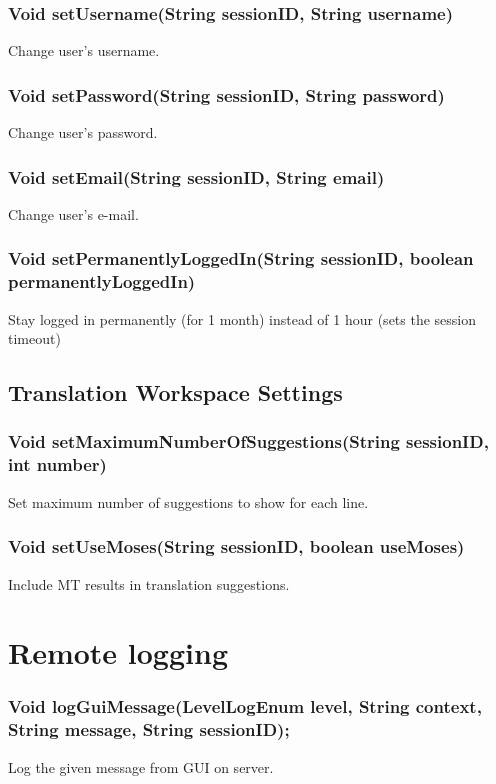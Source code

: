 \subsubsection{Void setUsername(String sessionID, String username)}
Change user's username.

\subsubsection{Void setPassword(String sessionID, String password)}
Change user's password.

\subsubsection{Void setEmail(String sessionID, String email)}
Change user's e-mail.

\subsubsection{Void setPermanentlyLoggedIn(String sessionID, boolean permanentlyLoggedIn)}
Stay logged in permanently (for 1 month) instead of 1 hour (sets the session timeout)

\subsection{Translation Workspace Settings}

\subsubsection{Void setMaximumNumberOfSuggestions(String sessionID, int number)}
Set maximum number of suggestions to show for each line.

\subsubsection{Void setUseMoses(String sessionID, boolean useMoses)}
Include MT results in translation suggestions.

\section{Remote logging}
    

\subsubsection{Void logGuiMessage(LevelLogEnum level, String context, String message, String sessionID);}
Log the given message from GUI on server.

